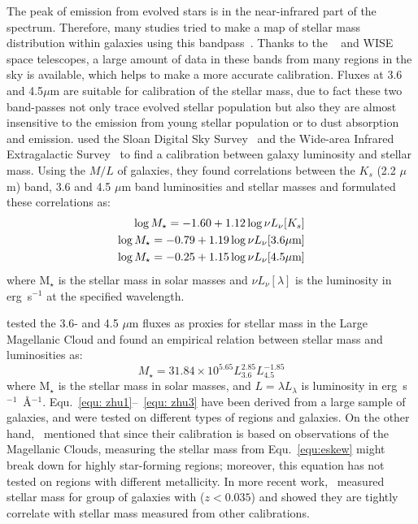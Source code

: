 The peak of emission from evolved stars is in the near-infrared part of the spectrum.
Therefore, many studies tried to make a map of stellar mass distribution within galaxies using this bandpass~\citep[e.g.,][]{Elmgreen84}.
Thanks to the \Spitzer~\citep{Wener04} and WISE~\citep{Wright10} space telescopes, a large amount of data in these bands from many regions in the sky is available, which helps to make a more accurate calibration. 
Fluxes at 3.6 and 4.5$\mu$m are suitable for calibration of the stellar mass, due to fact these two band-passes not only trace evolved stellar population but also they are almost insensitive to the emission from young stellar population or to dust absorption and emission. 
\cite{Zhu10} used the Sloan Digital Sky Survey~\citep[SDSS][]{York00} and the \Spitzer Wide-area Infrared Extragalactic Survey~\citep[SWIRE;][] {Lonsdale03} to find a calibration between galaxy luminosity and stellar mass. 
Using the $M/L$ of galaxies, they found correlations between the $K_s$ (2.2 $\mu$m) band, 3.6 and 4.5 $\mu$m band luminosities and stellar masses and formulated these correlations as:
\begin{align}
\label{equ: zhu1}
\log M_{\star} = -1.60  + 1.12  \log \nu L_{\nu}[K_s]\\
\log M_{\star} = -0.79 + 1.19 \log \nu L_{\nu}[3.6\mu \rm m]\\
\label{equ: zhu3}
\log M_{\star} = -0.25 + 1.15\log \nu L_{\nu}[4.5\mu \rm m] 
\end{align}
where M$_{\star}$ is the stellar mass in solar masses and $ \nu L_{\nu}[\lambda]$ is the luminosity in erg~s$^{-1}$ at the specified wavelength.

\cite{Eskew12} tested the 3.6- and 4.5 $\mu$m fluxes as proxies for stellar mass in the Large Magellanic Cloud and found an empirical relation between stellar mass and luminosities as:
\begin{equation}
\label{equ:eskew}
  M_{\star} = 31.84 \times 10^{5.65} L_{3.6}^{2.85} L_{4.5}^{-1.85}
\end{equation}
where M$_{\star}$ is the stellar mass in solar masses, and $L = \lambda L_{\lambda}$ is luminosity in erg~s$^{-1}$~\AA$^{-1}$.
Equ.~\ref{equ: zhu1}--~\ref{equ: zhu3} have been derived from a large sample of galaxies, and were tested on different types of regions and galaxies. 
On the other hand,~\cite{Eskew12} mentioned that since their calibration is based on observations of the Magellanic Clouds,
measuring the stellar mass from Equ.~\ref{equ:eskew} might break down for highly star-forming regions; moreover, this equation has not tested on regions with different metallicity. 
In more recent work,~\cite{Laura16} measured stellar mass for group of galaxies with ($z < 0.035$) and  showed they are tightly correlate with stellar mass measured from other calibrations. 

